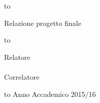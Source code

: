 \begin{titlepage}
\begin{center}
\vspace{2.0truecm}
\begin{minipage}[t][3cm][b]{0,5\textwidth}
\hbox to \textwidth{\hrulefill}
\begin{center}
\hspace{4cm}
Relazione progetto finale
\end{center}

\hbox to \textwidth{\hrulefill}
\end{minipage}


\vspace{3.0truecm}
\large
\begin{flushright}
Relatore \\
{}
\\
\vspace{1truecm}
Correlatore \\
{}
\end{flushright}

\vspace{0,8truecm}

\hbox to \textwidth{\hrulefill}
\Large
Anno Accademico 2015/16
\end{center}
\end{titlepage}

\thispagestyle{empty}
\cleardoublepage
